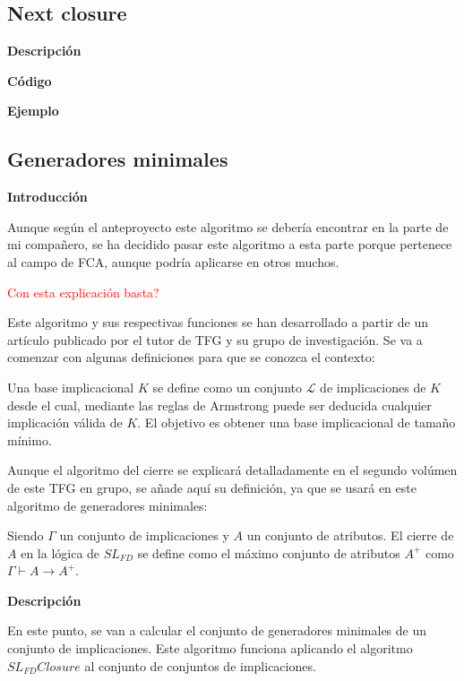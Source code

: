 \subsection{Next closure}

        \textbf{Descripci\'on}
    
    
        \textbf{C\'odigo}
    
    
        \textbf{Ejemplo}


        
\subsection{Generadores minimales}


    \textbf{Introducci\'on}

    Aunque seg\'un el anteproyecto este algoritmo se deber\'ia encontrar en la parte de mi compa\~nero, se ha decidido pasar este algoritmo 
    a esta parte porque pertenece al campo de FCA, aunque podr\'ia aplicarse en otros muchos.

    \textcolor{red}{Con esta explicaci\'on basta?}

    Este algoritmo y sus respectivas funciones se han desarrollado a partir de un art\'iculo publicado por el tutor de 
    TFG y su grupo de investigaci\'on\cite{cla2012}.
    Se va a comenzar con algunas definiciones para que se conozca el contexto:

    Una base implicacional \(K\) se define como un conjunto \(\mathcal{L}\) de implicaciones de \(K\) desde el cual, mediante las reglas de 
    Armstrong puede ser deducida cualquier implicaci\'on v\'alida de \(K\). El objetivo es obtener una base implicacional de tama\~no 
    m\'inimo.

    Aunque el algoritmo del cierre se explicar\'a detalladamente en el segundo vol\'umen de este TFG en grupo, se a\~nade aqu\'i su 
    definici\'on, ya que se usar\'a en este algoritmo de generadores minimales:

    Siendo \(\Gamma\) un conjunto de implicaciones y \(A\) un conjunto de atributos. El cierre de \(A\) en la l\'ogica de \(SL_{FD}\) se define como 
    el m\'aximo conjunto de atributos \(A^+\) como \(\Gamma \vdash A \rightarrow A^+\).


    \bigskip
    \textbf{Descripci\'on}

    En este punto, se van a calcular el conjunto de generadores minimales de un conjunto de implicaciones. Este algoritmo funciona aplicando 
    el algoritmo \(SL_{FD}Closure\) al conjunto de conjuntos de implicaciones.

